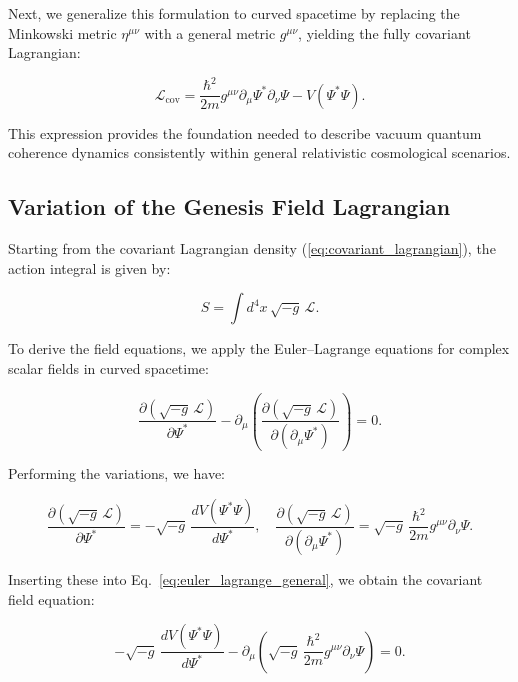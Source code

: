 Next, we generalize this formulation to curved spacetime by replacing the Minkowski metric $\eta^{\mu\nu}$ with a general metric $g^{\mu\nu}$, yielding the fully covariant Lagrangian:

\begin{equation}
\mathcal{L}_{\text{cov}} = \frac{\hbar^2}{2m}g^{\mu\nu}\partial_\mu\Psi^*\partial_\nu\Psi - V(\Psi^*\Psi).
\label{eq:covariant_lagrangian}
\end{equation}

This expression provides the foundation needed to describe vacuum quantum coherence dynamics consistently within general relativistic cosmological scenarios.

\subsection{Variation of the Genesis Field Lagrangian}

Starting from the covariant Lagrangian density (\ref{eq:covariant_lagrangian}), the action integral is given by:

\begin{equation}
S = \int d^4x \,\sqrt{-g}\,\mathcal{L}.
\label{eq:action_covariant}
\end{equation}

To derive the field equations, we apply the Euler–Lagrange equations for complex scalar fields in curved spacetime:

\begin{equation}
\frac{\partial (\sqrt{-g}\,\mathcal{L})}{\partial \Psi^*} - \partial_\mu \left(\frac{\partial (\sqrt{-g}\,\mathcal{L})}{\partial (\partial_\mu \Psi^*)}\right) = 0.
\label{eq:euler_lagrange_general}
\end{equation}

Performing the variations, we have:

\begin{equation}
\frac{\partial(\sqrt{-g}\,\mathcal{L})}{\partial \Psi^*} = -\sqrt{-g}\,\frac{dV(\Psi^*\Psi)}{d\Psi^*}, \quad
\frac{\partial(\sqrt{-g}\,\mathcal{L})}{\partial(\partial_\mu \Psi^*)} = \sqrt{-g}\,\frac{\hbar^2}{2m}g^{\mu\nu}\partial_\nu\Psi.
\label{eq:variations}
\end{equation}

Inserting these into Eq.~\eqref{eq:euler_lagrange_general}, we obtain the covariant field equation:

\begin{equation}
-\sqrt{-g}\,\frac{dV(\Psi^*\Psi)}{d\Psi^*} - \partial_\mu\left(\sqrt{-g}\,\frac{\hbar^2}{2m}g^{\mu\nu}\partial_\nu\Psi\right) = 0.
\label{eq:euler_lagrange}
\end{equation}


